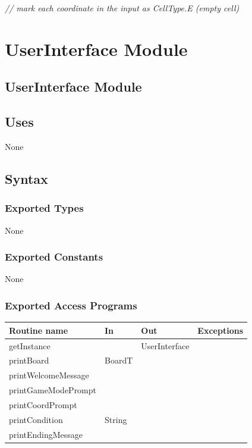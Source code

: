 \documentclass[12pt]{article}
\begin{document}
\textit{// mark each coordinate in the input as CellType.E (empty cell)}

\newpage

\section* {UserInterface Module}

\subsection* {UserInterface Module}

\subsection* {Uses}

None

\subsection* {Syntax}

\subsubsection* {Exported Types}

None

\subsubsection* {Exported Constants}

None

\subsubsection* {Exported Access Programs}

\begin{tabular}{| l | l | l | p{6cm} |}
\hline
\textbf{Routine name} & \textbf{In} & \textbf{Out} & \textbf{Exceptions}\\
\hline
getInstance & ~ & UserInterface &  \\
\hline
printBoard & BoardT & ~ & \\
\hline
printWelcomeMessage & ~ & ~ & \\
\hline
printGameModePrompt & ~ & ~ & \\
\hline
printCoordPrompt & ~ & ~ & \\
\hline
printCondition & String & ~ & \\
\hline
printEndingMessage & ~ & ~ & \\
\hline
\end{tabular}
\end{document}
